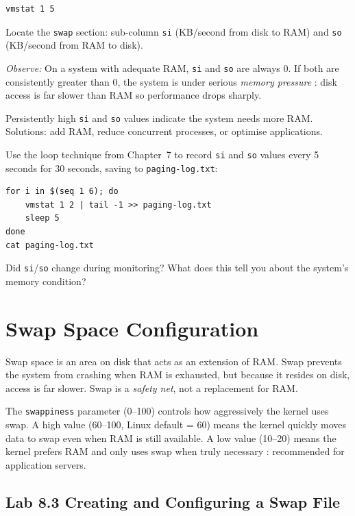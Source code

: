 \begin{lstlisting}[caption={Virtual memory statistics}]
vmstat 1 5
\end{lstlisting}

Locate the \texttt{swap} section: sub-column \texttt{si} (KB/second from disk to
RAM) and \texttt{so} (KB/second from RAM to disk).

\textit{Observe:} On a system with adequate RAM, \texttt{si} and \texttt{so} are
always 0. If both are consistently greater than 0, the system is under serious
\textit{memory pressure} : disk access is far slower than RAM so performance
drops sharply.

\begin{warningbox}
Persistently high \texttt{si} and \texttt{so} values indicate the system needs
more RAM. Solutions: add RAM, reduce concurrent processes, or optimise applications.
\end{warningbox}

\begin{challengebox}
Use the loop technique from Chapter~7 to record \texttt{si} and \texttt{so} values
every 5 seconds for 30 seconds, saving to \texttt{paging-log.txt}:
\begin{lstlisting}
for i in $(seq 1 6); do
    vmstat 1 2 | tail -1 >> paging-log.txt
    sleep 5
done
cat paging-log.txt
\end{lstlisting}
Did \texttt{si}/\texttt{so} change during monitoring? What does this tell you
about the system's memory condition?
\end{challengebox}

\section{Swap Space Configuration}

Swap space is an area on disk that acts as an extension of RAM. Swap prevents
the system from crashing when RAM is exhausted, but because it resides on disk,
access is far slower. Swap is a \textit{safety net}, not a replacement for RAM.

The \texttt{swappiness} parameter (0--100) controls how aggressively the kernel
uses swap. A high value (60--100, Linux default = 60) means the kernel quickly
moves data to swap even when RAM is still available. A low value (10--20) means
the kernel prefers RAM and only uses swap when truly necessary : recommended for
application servers.

\subsection*{Lab 8.3 Creating and Configuring a Swap File}

